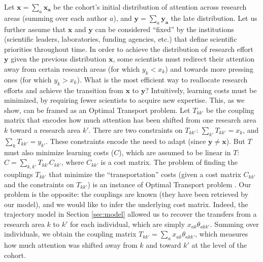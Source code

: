\documentclass{article}
\begin{document}
Let $\bm{x}=\sum_a \bm{x_a}$ be the cohort's initial distribution of attention across research areas (summing over each author $a$), and $\bm{y}=\sum_a \bm{y_a}$ the late distribution. Let us further assume that $\bm{x}$ and $\bm{y}$ can be considered ``fixed'' by the institutions (scientific leaders, laboratories, funding agencies, etc.) that define scientific priorities throughout time. In order to achieve the distribution of research effort $\bm{y}$ given the previous distribution $\bm{x}$, some scientists must redirect their attention away from certain research areas (for which $y_k<x_k$) and towards more pressing ones (for which $y_k>x_k$). What is the most efficient way to reallocate research efforts and achieve the transition from $\bm{x}$ to $\bm{y}$? Intuitively, learning costs must be minimized, by requiring fewer scientists to acquire new expertise. This, as we show, can be framed as an Optimal Transport problem. Let $T_{kk'}$ be the coupling matrix that encodes how much attention has been shifted from one research area $k$ toward a research area $k'$. There are two constraints on $T_{kk'}$: $\sum_{k'} T_{kk'} = x_k$, and $\sum_{k} T_{kk'} = y_{k'}$. These constraints encode the need to adapt (since $\bm{y}\neq \bm{x}$). But $T$ must also minimize learning costs ($C$), which are assumed to be linear in $T$: $C=\sum_{k,k'}T_{kk'}C_{kk'}$, where $C_{kk'}$ is a cost matrix. The problem of finding the couplings $T_{kk'}$ that minimize the ``transportation'' costs (given a cost matrix $C_{kk'}$ and the constraints on $T_{kk'}$) is an instance of Optimal Transport problem \citep{Peyre2018}. Our problem is the opposite: the couplings are known (they have been retrieved by our model), and we would like to infer the underlying cost matrix. Indeed, the trajectory model in Section \ref{sec:model} allowed us to recover the transfers from a research area $k$ to $k'$ for each individual, which are simply $x_{ak}\theta_{akk'}$. Summing over individuals, we obtain the coupling matrix $T_{kk'}=\sum_a x_{ak} \theta_{akk'}$, which measures how much attention was shifted away from $k$ and toward $k'$ at the level of the cohort.
\end{document}
